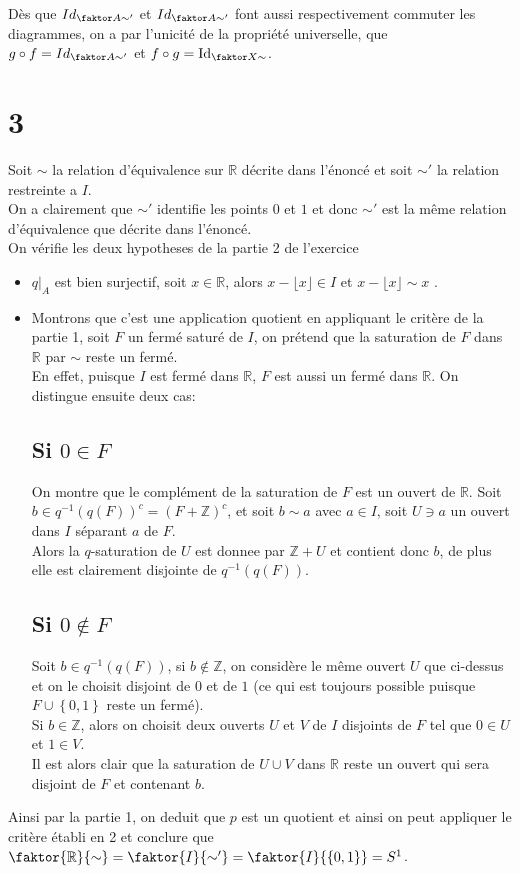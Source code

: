 \documentclass[11pt, a4paper]{article}
\DeclareMathOperator{\id}{Id}
\begin{document}
Dès que \(Id_{\faktor A { \sim '}}\) et \(Id_{\faktor A { \sim '}}\) font aussi respectivement commuter les diagrammes, on a par l'unicité de la propriété universelle, que \(g\circ f = Id_{\faktor A { \sim '}}\) et \(f\circ g = \id_{ \faktor X \sim}\). 

\section*{3}
Soit $\sim $ la relation d'équivalence sur $ \mathbb{R}$ décrite dans l'énoncé et soit $\sim '$ la relation restreinte a $I$.\\
On a clairement que $\sim '$ identifie les points $0$ et $1$ et donc $\sim '$ est la même relation d'équivalence que décrite dans l'énoncé.\\
On vérifie les deux hypotheses de la partie 2 de l'exercice
\begin{itemize}
\item $q\vert_A$ est bien surjectif, soit $x\in \mathbb{R}$, alors $x- \lfloor x\rfloor\in I$ et $ x- \lfloor x \rfloor \sim x$ .
\item Montrons que c'est une application quotient en appliquant le critère de la partie 1, soit $ F$ un fermé saturé de $I$, on prétend que la saturation de $F$ dans $ \mathbb{R}$ par $\sim$  reste un fermé.\\
	En effet, puisque $I$ est fermé dans $ \mathbb{R}$, $F$ est aussi un fermé dans $ \mathbb{R}$.
	On distingue ensuite deux cas:
	\subsection*{Si $ 0 \in F$ }
	On montre que le complément de la saturation de $F$ est un ouvert de $ \mathbb{R}$.
	Soit $ b\in q^{-1}( q( F) ) ^{c} = ( F + \mathbb{Z})^{c}$, et soit $ b \sim a$ avec $a \in I$, soit $U\ni a$ un ouvert dans $I$ séparant $ a$ de $F$.\\
	Alors la $q$-saturation de $ U$ est donnee par $ \mathbb{Z}+ U$ et contient donc $b$, de plus elle est clairement disjointe de $ q^{-1}( q( F) ) $.
	\subsection*{ Si $ 0\notin F$ }
	Soit $ b \in q^{-1}( q( F) ) $, si $ b \notin \mathbb{Z}$, on considère le même ouvert $U$ que ci-dessus et on le choisit disjoint de $ 0$ et de $1$ (ce qui est toujours possible puisque $ F \cup \left\{ 0,1 \right\} $  reste un fermé).\\
	Si $ b \in \mathbb{Z}$, alors on choisit deux ouverts $U$ et $V$ de $I$ disjoints de $F$ tel que $ 0\in U$ et $ 1\in V$.\\
	Il est alors clair que la saturation de $U\cup V$ dans $ \mathbb{R}$ reste un ouvert qui sera disjoint de $F$ et contenant \(b\).
	
\end{itemize}
Ainsi par la partie 1, on deduit que $ p$ est un quotient et ainsi on peut appliquer le critère établi en 2 et conclure que $\faktor  { \mathbb{R} } { \sim} = \faktor { I} { \sim '} = \faktor { I} { \left\{ 0,1 \right\}  } = S^{1}$. 
\end{document}
